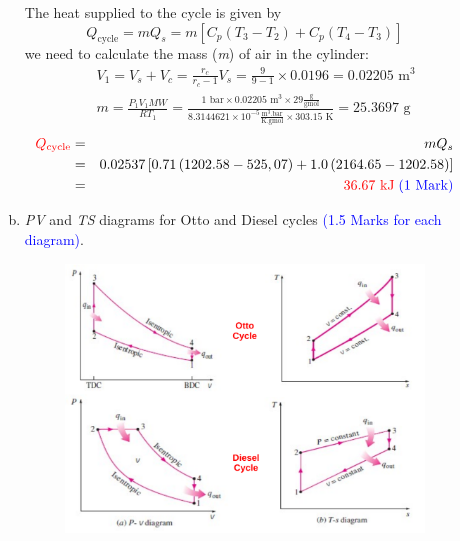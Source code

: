 \documentclass[12pt,twoside]{report}
\newcommand{\frc}{\displaystyle\frac}
\begin{document}
\begin{description}
\begin{enumerate}[(a)]
The heat supplied to the cycle is given by 
\begin{displaymath}
Q_{\text{cycle}} = m Q_{s} = m \left[ C_{p}\left(T_{3}-T_{2}\right) + C_{p}\left(T_{4}-T_{3}\right)\right] 
\end{displaymath}
we need to calculate the mass ({\it m}) of air in the cylinder:
\begin{eqnarray}
&& V_{1}=V_{s}+V_{c}=\frc{r_{c}}{r_{c}-1}V_{s}=\frc{9}{9-1}\times 0.0196 = 0.02205\text{ m}^{3} \nonumber \\
&& m = \frc{P_{1}V_{1} MW}{R T_{1}}= \frc{ 1\text{ bar} \times 0.02205\text{ m}^{3} \times 29 \frc{\text{g}}{\text{gmol}}} {8.3144621\times 10^{-5} \frc{\text{m}^{3}\text{.bar}}{\text{K.gmol}} \times 303.15\text{ K}} = 25.3697\text{ g} \nonumber 
\end{eqnarray}
\begin{eqnarray}
 \textcolor{red}{Q_{\text{cycle}}} &=& mQ_{s} \nonumber \\
 &=& 0.02537\left[0.71\left(1202.58-525,07\right) + 1.0\left(2164.65 - 1202.58\right)\right] \nonumber \\
 &=& \textcolor{red}{36.67\text{ kJ}} \;\textcolor{blue}{\text{(1 Mark)}} \nonumber
\end{eqnarray}


\item {\it PV} and {\it TS} diagrams for Otto and Diesel cycles \textcolor{blue}{(1.5 Marks for each diagram)}.

    \begin{figure}[h]
     \begin{center}
      \includegraphics[width=15.cm,clip]{./Pics/InternalCombustion_IdealOttoxDieselCycles}
     \end{center}
    \end{figure}  


\end{enumerate}
\end{description}
\end{document}
